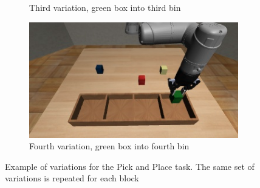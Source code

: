 \begin{figure}[htb]
\begin{subfigure}[b]{0.4\textwidth}
        \caption{Third variation, green box into third bin}
        \label{fig:third_variation}
    \end{subfigure}
    \hfill
    \begin{subfigure}[b]{0.4\textwidth}
        \centering
        \includegraphics[width=\textwidth]{Figures/images/pick_place/task_4.png}
        \caption{Fourth variation, green box into fourth bin}
        \label{fig:fourth_variation}
    \end{subfigure}
    \caption{Example of variations for the Pick and Place task. The same set of variations is repeated for each block}
    \label{fig:example_of_variations_for_pick_place}
\end{figure}


